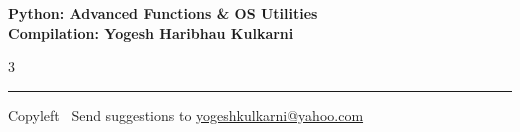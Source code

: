 \documentclass[8pt,landscape]{article}
\begin{document}
\footnotesize


\begin{center}
\Large{\textbf{Python: Advanced Functions \& OS Utilities\\ Compilation: Yogesh Haribhau Kulkarni}}
\end{center}

\begin{multicols}{3}

\end{multicols}

\rule{\linewidth}{0.25pt}
\scriptsize
Copyleft \textcopyleft\  Send suggestions to
\href{http://www.yogeshkulkarni.com}{yogeshkulkarni@yahoo.com}
\end{document}
